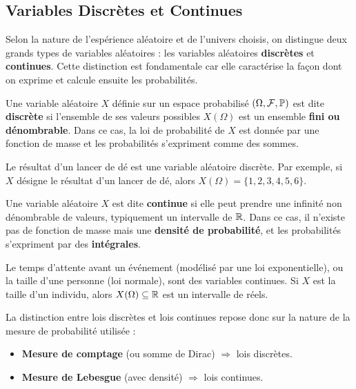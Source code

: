 \subsection{Variables Discrètes et Continues}

Selon la nature de l'espérience aléatoire et de l'univers choisis, on distingue deux grands types de variables aléatoires : 
les variables aléatoires \textbf{discrètes} et \textbf{continues}. Cette distinction est fondamentale car elle 
caractérise la façon dont on exprime et calcule ensuite les probabilités.

\begin{definition}
    Une variable aléatoire $X$ définie sur un espace probabilisé $(\Omega, \mathcal{F}, \mathbb{P})$ est dite 
    \textbf{discrète} si l'ensemble de ses valeurs possibles $X(\Omega)$ est un ensemble \textbf{fini ou dénombrable}. 
    Dans ce cas, la loi de probabilité de $X$ est donnée par une fonction de masse et les probabilités 
    s'expriment comme des sommes. 
\end{definition}

\begin{example}
    Le résultat d'un lancer de dé est une variable aléatoire discrète. 
    Par exemple, si $X$ désigne le résultat d’un lancer de dé, alors $X(\Omega) = \{1,2,3,4,5,6\}$.
\end{example}

\begin{definition}
    Une variable aléatoire $X$ est dite \textbf{continue} si elle peut prendre une infinité non dénombrable de valeurs, typiquement un intervalle de $\mathbb{R}$. 
    Dans ce cas, il n'existe pas de fonction de masse mais une \textbf{densité de probabilité}, et les probabilités s'expriment 
    par des \textbf{intégrales}.
\end{definition}


\begin{example}
    Le temps d'attente avant un événement (modélisé par une loi exponentielle), ou la taille d'une personne (loi normale), 
    sont des variables continues. Si $X$ est la taille d’un individu, alors $X(\Omega) \subseteq \mathbb{R}$ est un intervalle de réels.
\end{example}

\begin{remark}
    La distinction entre lois discrètes et lois continues repose donc sur la nature de la mesure de probabilité utilisée :
    \begin{itemize}
        \item \textbf{Mesure de comptage} (ou somme de Dirac) $\Rightarrow$ lois discrètes.
        \item \textbf{Mesure de Lebesgue} (avec densité) $\Rightarrow$ lois continues.
    \end{itemize}
\end{remark}

